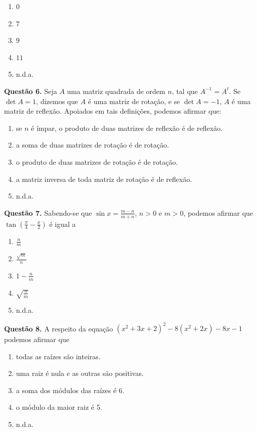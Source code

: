 \documentclass[11pt]{article}
\begin{document}
\begin{multicols}{5}
    \begin{enumerate}[\bf A (\quad)]
        \item $0$
        \item $7$
        \item $9$
        \item $11$
        \item n.d.a.
    \end{enumerate}
\end{multicols}

\textbf{Questão 6.} Seja $A$ uma matriz quadrada de ordem $n$, tal que $A^{-1}=A^t$. Se $\det A = 1$, dizemos que $A$ é uma matriz de rotação, e se $\det A = -1$, $A$ é uma matriz de reflexão. Apoiados em tais definições, podemos afirmar que:

\begin{enumerate}[\bf A (\quad)]
	\item se $n$ é ímpar, o produto de duas matrizes de reflexão é de reflexão.
	\item a soma de duas matrizes de rotação é de rotação.
	\item o produto de duas matrizes de rotação é de rotação.
    \item a matriz inversa de toda matriz de rotação é de reflexão.
    \item n.d.a.
\end{enumerate}

\textbf{Questão 7.} Sabendo-se que $\displaystyle \sin x = \frac{m-n}{m+n}$, $n > 0$ e $m > 0$, podemos afirmar que $\displaystyle \tan \left( \frac{\pi}{4} - \frac{x}{2} \right)$ é igual a

\begin{multicols}{5}
    \begin{enumerate}[\bf A (\quad)]
        \item $\displaystyle \frac{n}{m}$
        \item $\displaystyle \frac{\sqrt{m}}{n}$
        \item $\displaystyle 1 - \frac{n}{m}$
        \item $\displaystyle \sqrt{\frac{n}{m}} $
        \item n.d.a.
    \end{enumerate}
\end{multicols}

\textbf{Questão 8.} A respeito da equação $(x^2 + 3x + 2)^2 - 8(x^2 + 2x) - 8x -1$ podemos afirmar que

\begin{enumerate}[\bf A (\quad)]
    \item todas as raízes são inteiras.
    \item uma raiz é nula e as outras são positivas.
    \item a soma dos módulos das raízes é 6.
    \item o módulo da maior raiz é 5.
    \item n.d.a.
\end{enumerate}
\end{document}
